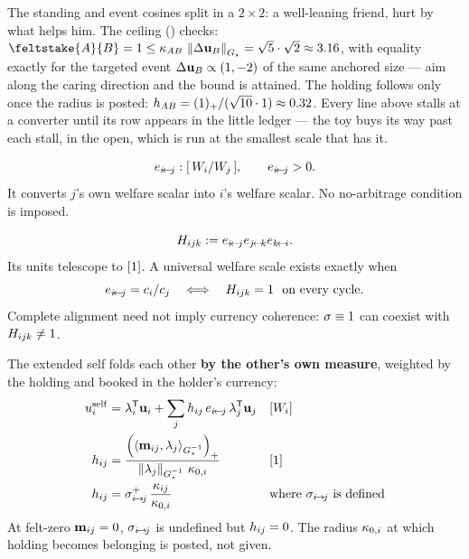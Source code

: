 \documentclass[../main]{subfiles}
\begin{document}
The standing and event cosines split in a $2\times2$: a well-leaning friend, hurt by
what helps him. The ceiling () checks:
$\feltstake{A}{B}=1\le\coupling{A}{B}\,\normGvec{\outcomechange{B}}=\sqrt5\cdot\sqrt2\approx3.16$,
with equality exactly for the targeted event $\Delta\mathbf{u}\sb{B}\propto(1,-2)$ of the same
anchored size --- aim along the caring direction and the bound is attained. The holding
follows only once the radius is posted:
$h\sb{ AB }=(1)_+/(\sqrt{10}\cdot1)\approx0.32$. Every line above stalls at a
converter until its row appears in the little ledger --- the toy buys its way past each
stall, in the open, which is  run at the smallest scale that has it.

\begin{definition}
  \begin{equation}
    e\sb{ \ensuremath{i\!\leftarrow\!j} }:[\,W\sb{i}/W\sb{j}\,],
    \qquad
    e\sb{ \ensuremath{i\!\leftarrow\!j} }>0.
    \label{eq:c:exch}
  \end{equation}
  It converts $j$'s own welfare scalar into $i$'s welfare scalar. No no-arbitrage condition
  is imposed.
\end{definition}

\begin{definition}
  \begin{equation}
    H\sb{ \ensuremath{ijk} }:=e\sb{ \ensuremath{i\!\leftarrow\!j} }e\sb{ \ensuremath{j\!\leftarrow\!k} }e\sb{ \ensuremath{k\!\leftarrow\!i} }.
    \label{eq:f:holonomy}
  \end{equation}
  Its units telescope to $[1]$. A universal welfare scale exists exactly when
  \begin{equation}
    e\sb{ \ensuremath{i\!\leftarrow\!j} }=c_i/c_j
    \quad\Longleftrightarrow\quad
    H\sb{ \ensuremath{ijk} }=1\ \text{ on every cycle}.
    \label{eq:f:holonomy-coherence}
  \end{equation}
  Complete alignment need not imply currency coherence: $\sigma\equiv1$ can coexist with
  $H\sb{ \ensuremath{ijk} }\neq1$.
\end{definition}

\begin{definition}
  The extended self folds each other \textbf{by the other's own measure}, weighted by the
  holding and booked in the holder's currency:
  \begin{align}
    u\sb{i}\sp{\mathrm{self}} &= \lambda\sb{i}\sp{\mathsf{T}}\mathbf{u}\sb{i}
      + \sum_j h\sb{ ij }\,e\sb{ \ensuremath{i\!\leftarrow\!j} }\,\lambda\sb{j}\sp{\mathsf{T}}\mathbf{u}\sb{j}
      && [W\sb{i}] \label{eq:nrm:incl}\\
    h\sb{ ij } &= \frac{\left(\langle \mathbf{m}\sb{ ij } , \lambda\sb{j} \rangle\sb{ \ensuremath{G\sb{\star}} \sp{-1}}\right)\sb{+}}{\left\lVert \lambda\sb{j} \right\rVert\sb{ \ensuremath{G\sb{\star}} \sp{-1}}\,\kappa\sb{0,i}}
      && [1] \label{eq:nrm:holding}\\
    h\sb{ ij } &= \sigma\sb{ i\!\to\!j }\sp{+}\,\frac{\kappa\sb{ ij }}{\kappa\sb{0,i}}
      && \text{where }\sigma\sb{ i\!\to\!j }\text{ is defined} \label{eq:nrm:holding-cos}
  \end{align}
  At felt-zero $\mathbf{m}\sb{ ij }=0$, $\sigma\sb{ i\!\to\!j }$ is undefined but
  $h\sb{ ij }=0$. The radius $\kappa\sb{0,i}$ at which holding becomes belonging
  is posted, not given.
\end{definition}
\end{document}
